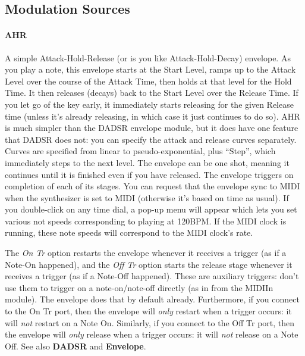 \documentclass{article}
\begin{document}
\subsection{Modulation Sources}
\label{modsources}

\paragraph{AHR}  A simple Attack-Hold-Release (or is you like Attack-Hold-Decay) envelope.  As you play a note, this envelope starts at the Start Level, ramps up to the Attack Level over the course of the Attack Time, then holds at that level for the Hold Time.  It then releases (decays) back to the Start Level over the Release Time.  If you let go of the key early, it immediately starts releasing for the given Release time (unless it's already releasing, in which case it just continues to do so).  AHR is much simpler than the DADSR envelope module, but it does have one feature that DADSR does not: you can specify the attack and release curves separately.  Curves are specified from linear to pseudo-exponential, plus ``Step'', which immediately steps to the next level.  The envelope can be one shot, meaning it continues until it is finished even if you have released.   The envelope triggers on completion of each of its stages.  You can request that the envelope sync to MIDI when the synthesizer is set to MIDI (otherwise it's based on time as usual).  If you double-click on any time dial, a pop-up menu will appear which lets you set various not speeds corresponding to playing at 120BPM.  If the MIDI clock is running, these note speeds will correspond to the MIDI clock's rate.

The {\it On Tr} option restarts the envelope whenever it receives a trigger (as if a Note-On happened), and the {\it Off Tr} option starts the release stage whenever it receives a trigger (as if a Note-Off happened).  These are auxiliary triggers: don't use them to trigger on a note-on/note-off directly (as in from the MIDIIn module).  The envelope does that by default already.  Furthermore, if you connect to the On Tr port, then the envelope will {\it only} restart when a trigger occurs: it will {\it not} restart on a Note On.  Similarly, if you connect to the Off Tr port, then the envelope will {\it only} release when a trigger occurs: it will {\it not} release on a Note Off.  See also {\bf DADSR} and {\bf Envelope}.
\end{document}
